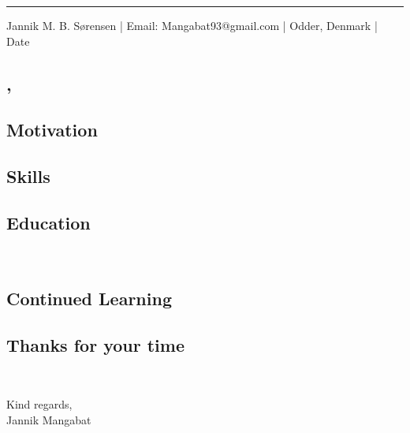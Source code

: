 \documentclass{article}
\begin{document}
\rule{\linewidth}{1pt} %

\begin{center}
    Jannik M. B. Sørensen |
    Email: Mangabat93@gmail.com | 
    Odder, Denmark | Date
\end{center}

\subsection*{\finalJobtitle, \finalCompanyName}
    \begin{spacing}{1.2}
        {\finalIntroduction}
    \end{spacing}
    \vspace*{0mm}

\subsection*{Motivation}
    \begin{spacing}{1.2}
        {\finalMotivation}
    \end{spacing}
    \vspace*{0mm}

\subsection*{Skills}
    \begin{spacing}{1.2}
        {\finalSkills}
    \end{spacing}
    \vspace*{0mm}

\subsection*{Education}
    \begin{spacing}{1.2}
        {\finalEducationMaster}\\
        {\finalEducationBachelor}
    \end{spacing}
    \vspace*{0mm}

\subsection*{Continued Learning}
    \begin{spacing}{1.2}
        {\finalContinuedLearning}
    \end{spacing}
    \vspace*{0mm}

\subsection*{Thanks for your time}
    \begin{spacing}{1.2}
        {\finalThankYou}\\        
    \end{spacing}

\noindent Kind regards,\\
    Jannik Mangabat
\end{document}
